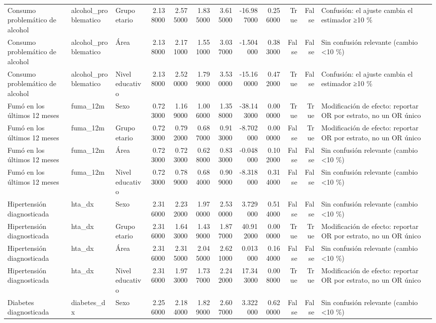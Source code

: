 \begin{table}[htbp]
\begin{tabular}{lllrrrrrrrrl}
Consumo problemático de alcohol & alcohol\_problematico & Grupo etario & 2.138000 & 2.575000 & 1.835000 & 3.615000 & -16.987000 & 0.256000 & True & False & Confusión: el ajuste cambia el estimador ≥10 \% \\
Consumo problemático de alcohol & alcohol\_problematico & Área & 2.138000 & 2.171000 & 1.551000 & 3.037000 & -1.504000 & 0.383000 & False & False & Sin confusión relevante (cambio <10 \%) \\
Consumo problemático de alcohol & alcohol\_problematico & Nivel educativo & 2.138000 & 2.520000 & 1.799000 & 3.530000 & -15.160000 & 0.472000 & True & False & Confusión: el ajuste cambia el estimador ≥10 \% \\
Fumó en los últimos 12 meses & fuma\_12m & Sexo & 0.723000 & 1.169000 & 1.006000 & 1.358000 & -38.143000 & 0.000000 & True & True & Modificación de efecto: reportar OR por estrato, no un OR único \\
Fumó en los últimos 12 meses & fuma\_12m & Grupo etario & 0.723000 & 0.792000 & 0.687000 & 0.913000 & -8.702000 & 0.000000 & False & True & Modificación de efecto: reportar OR por estrato, no un OR único \\
Fumó en los últimos 12 meses & fuma\_12m & Área & 0.723000 & 0.723000 & 0.628000 & 0.833000 & -0.048000 & 0.102000 & False & False & Sin confusión relevante (cambio <10 \%) \\
Fumó en los últimos 12 meses & fuma\_12m & Nivel educativo & 0.723000 & 0.789000 & 0.684000 & 0.909000 & -8.318000 & 0.314000 & False & False & Sin confusión relevante (cambio <10 \%) \\
Hipertensión diagnosticada & hta\_dx & Sexo & 2.316000 & 2.232000 & 1.970000 & 2.530000 & 3.729000 & 0.514000 & False & False & Sin confusión relevante (cambio <10 \%) \\
Hipertensión diagnosticada & hta\_dx & Grupo etario & 2.316000 & 1.643000 & 1.439000 & 1.877000 & 40.912000 & 0.000000 & True & True & Modificación de efecto: reportar OR por estrato, no un OR único \\
Hipertensión diagnosticada & hta\_dx & Área & 2.316000 & 2.315000 & 2.045000 & 2.621000 & 0.013000 & 0.164000 & False & False & Sin confusión relevante (cambio <10 \%) \\
Hipertensión diagnosticada & hta\_dx & Nivel educativo & 2.316000 & 1.973000 & 1.737000 & 2.242000 & 17.343000 & 0.008000 & True & True & Modificación de efecto: reportar OR por estrato, no un OR único \\
Diabetes diagnosticada & diabetes\_dx & Sexo & 2.256000 & 2.184000 & 1.829000 & 2.607000 & 3.322000 & 0.620000 & False & False & Sin confusión relevante (cambio <10 \%) \\

\end{tabular}
\end{table}
